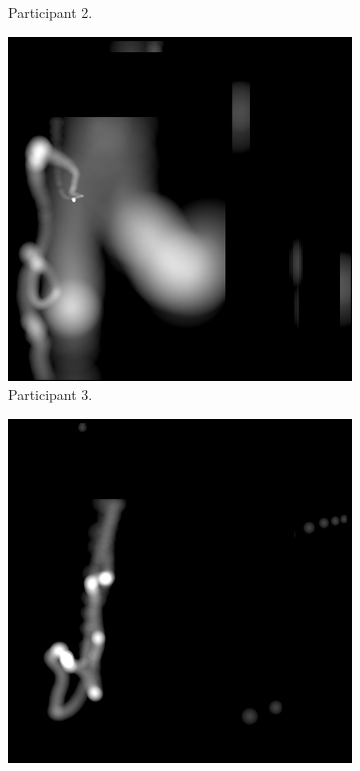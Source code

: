 \begin{figure}[!ht]
\begin{subfigure}[b]{0.24\textwidth}
        \caption{Participant 2.}
    \end{subfigure}
    \hfill
    \begin{subfigure}[b]{0.24\textwidth}
        \centering
        \includegraphics[width=\textwidth]{img/data/Panel14/single/3.png}
        \caption{Participant 3.}
    \end{subfigure}
    \hfill
    \begin{subfigure}[b]{0.24\textwidth}
        \centering
        \includegraphics[width=\textwidth]{img/data/Panel14/single/4.png}

\end{subfigure}
\end{figure}
